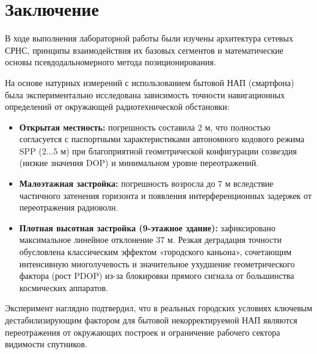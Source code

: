 \section{Заключение}

В ходе выполнения лабораторной работы были изучены архитектура сетевых СРНС, принципы взаимодействия их базовых сегментов и математические основы псевдодальномерного метода позиционирования.

На основе натурных измерений с использованием бытовой НАП (смартфона) была экспериментально исследована зависимость точности навигационных определений от окружающей радиотехнической обстановки:
\begin{itemize}
    \item \textbf{Открытая местность:} погрешность составила $2\text{ м}$, что полностью согласуется с паспортными характеристиками автономного кодового режима SPP ($2\dots5\text{ м}$) при благоприятной геометрической конфигурации созвездия (низкие значения DOP) и минимальном уровне переотражений.
    \item \textbf{Малоэтажная застройка:} погрешность возросла до $7\text{ м}$ вследствие частичного затенения горизонта и появления интерференционных задержек от переотражения радиоволн.
    \item \textbf{Плотная высотная застройка (9-этажное здание):} зафиксировано максимальное линейное отклонение $37\text{ м}$. Резкая деградация точности обусловлена классическим эффектом «городского каньона», сочетающим интенсивную многолучевость и значительное ухудшение геометрического фактора (рост PDOP) из-за блокировки прямого сигнала от большинства космических аппаратов.
\end{itemize}

Эксперимент наглядно подтвердил, что в реальных городских условиях ключевым дестабилизирующим фактором для бытовой некорректируемой НАП являются переотражения от окружающих построек и ограничение рабочего сектора видимости спутников.
